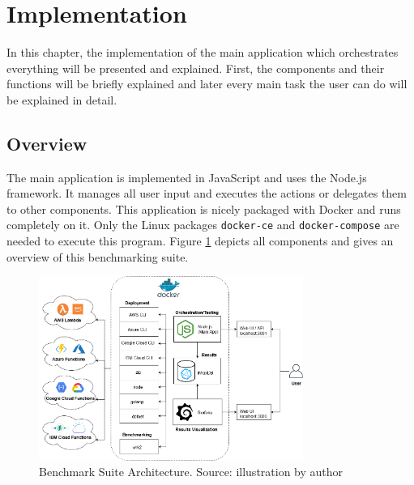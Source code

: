 
\section{Implementation}
In this chapter, the implementation of the main application which orchestrates everything will be presented and explained. First, the components and their functions will be briefly explained and later every main task the user can do will be explained in detail.

\subsection{Overview}
The main application is implemented in JavaScript and uses the Node.js framework. It manages all user input and executes the actions or delegates them to other components. This application is nicely packaged with Docker and runs completely on it. Only the Linux packages \texttt{docker-ce} and \texttt{docker-compose} are needed to execute this program. Figure \ref{fig:architecture} depicts all components and gives an overview of this benchmarking suite.

\begin{figure}[htp]
\begin{center}
\includegraphics[width=0.77\textwidth]{bilder/main_app.png}
\captionsetup{justification=centering, labelfont=bf}
\caption[Benchmark Suite Architecture]{Benchmark Suite Architecture. Source: illustration by author}
\label{fig:architecture}
\end{center}
\end{figure}

